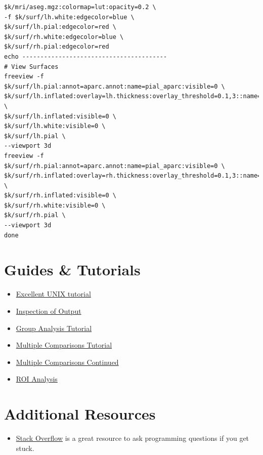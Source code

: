 \documentclass[paper=a4, fontsize=11pt]{scrartcl} %
\numberwithin{equation}{section} %
\numberwithin{figure}{section} %
\numberwithin{table}{section} %
\begin{document}
\begin{appendices}
\begin{description}
\begin{lstlisting}
$k/mri/aseg.mgz:colormap=lut:opacity=0.2 \
-f $k/surf/lh.white:edgecolor=blue \
$k/surf/lh.pial:edgecolor=red \
$k/surf/rh.white:edgecolor=blue \
$k/surf/rh.pial:edgecolor=red
echo ----------------------------------------
# View Surfaces
freeview -f  $k/surf/lh.pial:annot=aparc.annot:name=pial_aparc:visible=0 \
$k/surf/lh.inflated:overlay=lh.thickness:overlay_threshold=0.1,3::name=inflated_thickness:visible=0 \
$k/surf/lh.inflated:visible=0 \
$k/surf/lh.white:visible=0 \
$k/surf/lh.pial \
--viewport 3d
freeview -f  $k/surf/rh.pial:annot=aparc.annot:name=pial_aparc:visible=0 \
$k/surf/rh.inflated:overlay=rh.thickness:overlay_threshold=0.1,3::name=inflated_thickness:visible=0 \
$k/surf/rh.inflated:visible=0 \
$k/surf/rh.white:visible=0 \
$k/surf/rh.pial \
--viewport 3d
done
\end{lstlisting}
\end{description}

\section{Guides \& Tutorials}
\begin{itemize}
\item \href{http://www.ee.surrey.ac.uk/Teaching/Unix/}{Excellent UNIX tutorial}
\item \href{https://surfer.nmr.mgh.harvard.edu/fswiki/FsTutorial/OutputData_freeview}{Inspection of Output}
\item \href{http://surfer.nmr.mgh.harvard.edu/fswiki/FsTutorial/GroupAnalysis}{Group Analysis Tutorial}
\item \href{http://surfer.nmr.mgh.harvard.edu/fswiki/FsTutorial/GroupAnalysis#ClusterwiseCorrectionforMultipleComparisons}{Multiple 
Comparisons Tutorial}
\item \href{http://surfer.nmr.mgh.harvard.edu/fswiki/FsTutorial/QdecMultipleComparisons}{Multiple Comparisons Continued}
\item \href{https://surfer.nmr.mgh.harvard.edu/fswiki/FsTutorial/AnatomicalROI}{ROI Analysis}
\end{itemize}
\section{Additional Resources}
\begin{itemize}
\item \href{http://stackoverflow.com}{Stack Overflow} is a great resource to ask programming questions if you get stuck.
\end{itemize}
\end{appendices}


 
\end{document}
